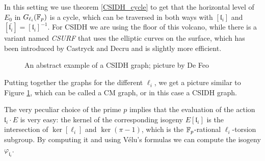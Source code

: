 In this setting we use theorem \ref{CSIDH_cycle} to get that the horizontal level of $E_0$ in $G_{\ell_i}(\mathbb{F}_p)$ is a cycle, which can be traversed in both ways with $[\mathfrak{l}_i]$ and $[\bar{\mathfrak{l}_i}]=[\mathfrak{l}_i]^{-1}$. For CSIDH we are using the floor of this volcano, while there is a variant named \emph{CSURF} that uses the elliptic curves on the surface, which has been introduced by Castryck and Decru \cite{CSURF} and is slightly more efficient.

\begin{figure}
    \centering
    \caption{An abstract example of a CSIDH graph; picture by De Feo}
    \label{picture_CSIDH}
\end{figure}

Putting together the graphs for the different $\ell_i$, we get a picture similar to Figure \ref{picture_CSIDH}, which can be called a CM graph, or in this case a CSIDH graph.

The very peculiar choice of the prime $p$ implies that the evaluation of the action $\mathfrak{l}_i\cdot E$ is very easy: the kernel of the corresponding isogeny $E[\mathfrak{l}_i]$ is the intersection of $\ker[\ell_i]$ and $\ker(\pi-1)$, which is the $\mathbb{F}_p$-rational $\ell_i$-torsion subgroup. By computing it and using Vélu's formulas we can compute the isogeny $\varphi_{\mathfrak{l}_i}$.

